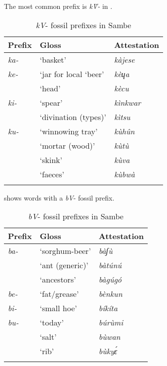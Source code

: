 \documentclass[output=paper]{langsci/langscibook}
\begin{document}
The most common prefix is \textit{k\`{V}-} in .

\begin{table}
\caption{\label{tab:nomaffplat:14}  {\textit{k}\`{\textit{V}}-} fossil prefixes in Sambe}
\begin{tabularx}{\textwidth}{XXX}
\lsptoprule
  Prefix 	& Gloss 	&   Attestation\\
  \midrule
\itshape ka- 	&  ‘basket’ 	&  \itshape kàjese\\
\tablevspace
\itshape ke- 	&  ‘jar for local ‘beer’ 	&  \itshape kèɥa\\
	&  ‘head’ 	&  \itshape kècu\\
\tablevspace
\itshape ki- 	&  ‘spear’ 	&  \itshape kìnkwar\\
	&  ‘divination (types)’ 	&  \itshape kìtsu\\
\tablevspace
\itshape ku- 	&  ‘winnowing tray’ 	&  \itshape kùhûn\\
	&  ‘mortar (wood)’ 	&  \itshape kùtù\\
	& ‘skink’ 	&  \itshape kùva 	 \\
	&  ‘faeces’ 	&  \itshape kùbwà\\
\lspbottomrule
\end{tabularx} 
\end{table}


  
 shows words with a \textit{bV}- fossil prefix.

\begin{table}
\caption{\label{tab:nomaffplat:15} \textit{bV}-  fossil prefixes in Sambe}
\begin{tabularx}{\textwidth}{XXX}
\lsptoprule
  Prefix 	& Gloss 	&   Attestation\\
  \midrule
\itshape ba- 	& ‘sorghum-beer’ 	&  \itshape bàʃù\\
	& ‘ant (generic)’ 	&  \itshape bàtúnú\\
	& ‘ancestors’ 	&  \itshape bàgúgó\\
\tablevspace
{\itshape be-} & ‘fat/grease’ 	&  \itshape bènkun \\
\tablevspace
\itshape bi- 	& ‘small hoe’ 	&  \itshape bíkíta\\
\tablevspace
\itshape bu- 	& ‘today’ 	&  \itshape búrùmi\\
	& ‘salt’ 	&  \itshape bùwan\\
	& ‘rib’ 	&  \itshape bùkyɛ́\\
\lspbottomrule
\end{tabularx}
\end{table}
\end{document}
